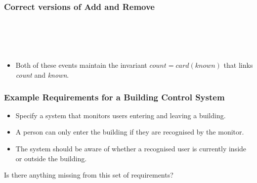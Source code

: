 \documentclass{beamer}
\begin{document}
\begin{frame}
\frametitle{Correct versions of Add and Remove}


\begin{columns}
\begin{column}{2in}
\end{column}
\begin{column}{2in}
\end{column}
\end{columns}

~

~

\begin{itemize}
  \item Both of these events maintain the invariant \alert{$count = card(known)$}
that \alert{links} \textit{count} and \textit{known}.
\end{itemize}

\end{frame}





\begin{frame}

\frametitle{Example  Requirements for a Building Control System}

\begin{itemize} \setlength{\itemsep}{6pt}
\item Specify a system that monitors users entering and leaving a
building. 
\item A person can only enter the building if they are
recognised by the monitor. 
\item The system should be aware of
whether a recognised
     user is currently inside or outside the building.

\end{itemize}

Is there anything missing from this set of requirements?

\end{frame}
\end{document}
